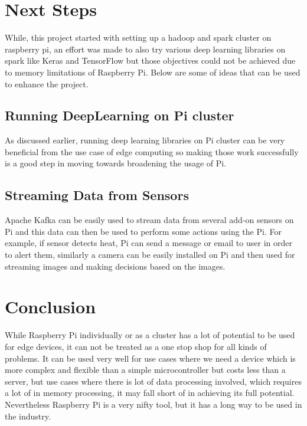 \section{Next Steps}

While, this project started with setting up a hadoop and spark cluster
on raspberry pi, an effort was made to also try various deep learning
libraries on spark like Keras and TensorFlow but those objectives could 
not be achieved due to memory limitations of Raspberry Pi. Below are 
some of ideas that can be used to enhance the project.

\subsection{Running DeepLearning on Pi cluster}

As discussed earlier, running deep learning libraries on Pi cluster
can be very beneficial from the use case of edge computing so making
those work successfully is a good step in moving towards broadening
the usage of Pi.

\subsection{Streaming Data from Sensors}
Apache Kafka can be easily used to stream data from several add-on sensors 
on Pi and this data can then be used to perform some actions using the Pi.
For example, if sensor detects heat, Pi can send a message or email to user
in order to alert them, similarly a camera can be easily installed on Pi
and then used for streaming images and making decisions based on the images.

\section{Conclusion}

While Raspberry Pi individually or as a cluster has a lot of potential
to be used for edge devices, it can not be treated as a one stop shop
for all kinds of problems. It can be used very well for use cases
where we need a device which is more complex and flexible than a
simple microcontroller but costs less than a server, but use cases
where there is lot of data processing involved, which requires a lot
of in memory processing, it may fall short of in achieving its full
potential. Nevertheless Raspberry Pi is a very nifty tool, but it has
a long way to be used in the industry.

 


